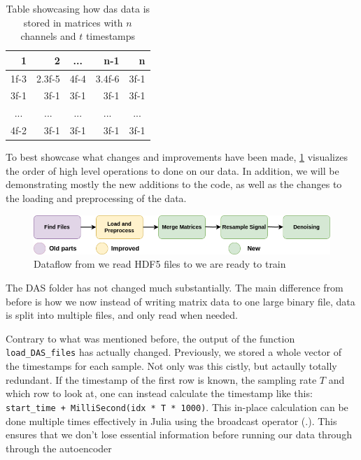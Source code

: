 \begin{table}[h]
\centering
\begin{tabular}{|r|r|r|r|r|}
\hline
\textbf{1}                & \textbf{2}               & \multicolumn{1}{c|}{\textbf{...}} & \textbf{n-1}             & \textbf{n}               \\ \hline
1f-3                      & 2.3f-5                   & 4f-4                              & 3.4f-6                   & 3f-1                     \\ \hline
3f-1                      & 3f-1                     & 3f-1                              & 3f-1                     & 3f-1                     \\ \hline
\multicolumn{1}{|c|}{...} & \multicolumn{1}{c|}{...} & \multicolumn{1}{c|}{...}          & \multicolumn{1}{c|}{...} & \multicolumn{1}{c|}{...} \\ \hline
4f-2                      & 3f-1                     & 3f-1                              & 3f-1                     & 3f-1                     \\ \hline
\end{tabular}
\caption{Table showcasing how \acrshort{das} data is stored in matrices with $n$ channels and $t$ timestamps}
\label{fig:datatable}
\end{table}

To best showcase what changes and improvements have been made, \ref{fig:apiflow} visualizes the order of high level operations to done on our data. In addition, we will be demonstrating mostly the new additions to the code, as well as the changes to the loading and preprocessing of the data. \\

\begin{figure}[h]
    \centering
    \includegraphics[scale=0.5]{figures/dataflow.png}
    \caption{Dataflow from we read HDF5 files to we are ready to train}
    \label{fig:apiflow}
\end{figure}

The DAS folder has not changed much substantially. The main difference from before is how we now instead of writing matrix data to one large binary file, data is split into multiple files, and only read when needed.

Contrary to what was mentioned before, the output of the function \texttt{load\_DAS\_files} has actually changed. Previously, we stored a whole vector of the timestamps for each sample. Not only was this cistly, but actaully totally redundant. If the timestamp of the first row is known, the sampling rate $T$ and which row to look at, one can instead calculate the timestamp like this: 
\lstinline|start_time + MilliSecond(idx * T * 1000)|. This in-place calculation can be done multiple times effectively in Julia using the broadcast operator (.). This ensures that we don't lose essential information before running our data through through the autoencoder

